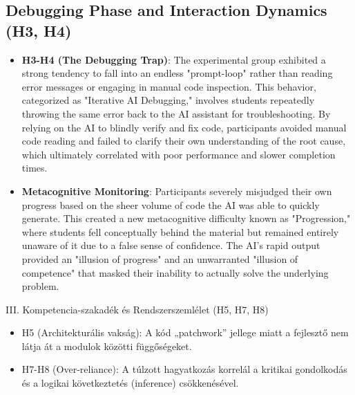 \documentclass[../main.tex]{subfiles}
\begin{document}
\subsection{Debugging Phase and Interaction Dynamics (H3, H4)}
\begin{itemize}
    \item \textbf{H3-H4 (The Debugging Trap)}: The experimental group exhibited a strong tendency to fall into an endless "prompt-loop" 
    rather than reading error messages or engaging in manual code inspection. This behavior, categorized as "Iterative AI Debugging," 
    involves students repeatedly throwing the same error back to the AI assistant for troubleshooting. By relying on the AI to blindly 
    verify and fix code, participants avoided manual code reading and failed to clarify their own understanding of the root cause, which 
    ultimately correlated with poor performance and slower completion times. \cite{shen2026how}
    \item \textbf{Metacognitive Monitoring}: Participants severely misjudged their own progress based on the sheer volume of code the 
    AI was able to quickly generate. This created a new metacognitive difficulty known as "Progression," where students fell conceptually 
    behind the material but remained entirely unaware of it due to a false sense of confidence. The AI's rapid output provided an 
    "illusion of progress" and an unwarranted "illusion of competence" that masked their inability to actually solve the underlying 
    problem. \cite{prather2024widening}
\end{itemize}

III. Kompetencia-szakadék és Rendszerszemlélet (H5, H7, H8)
\begin{itemize}
    \item H5 (Architekturális vakság): A kód „patchwork” jellege miatt a fejlesztő nem látja át a modulok közötti függőségeket.
    \item H7-H8 (Over-reliance): A túlzott hagyatkozás korrelál a kritikai gondolkodás és a logikai következtetés (inference) csökkenésével.
\end{itemize}
\end{document}
